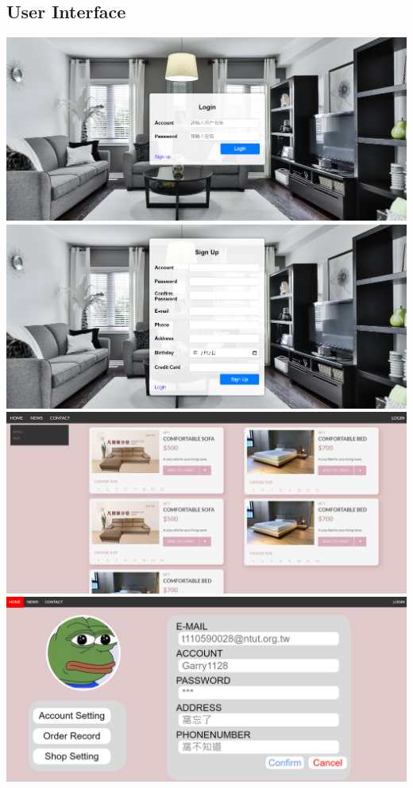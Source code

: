 \documentclass[a4paper, 12pt]{article}
\begin{document}
\subsection{User Interface}
\begin{center}
\includegraphics[scale=0.4]{ui/SignInPage.png}
\includegraphics[scale=0.4]{ui/SignUpPage.png}
\includegraphics[scale=0.4]{ui/MainPage.png}
\includegraphics[scale=0.4]{ui/AccountSettingPage1.png}

\end{center}
\end{document}
